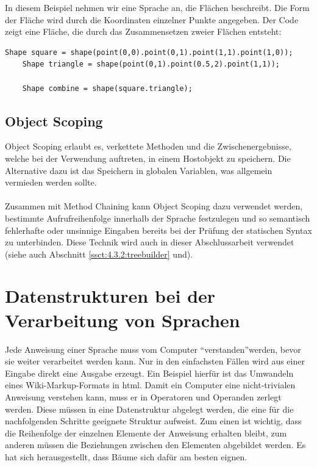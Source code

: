 In diesem Beispiel nehmen wir eine Sprache an, die Flächen beschreibt. Die Form der Fläche wird durch die Koordinaten einzelner Punkte angegeben. Der Code zeigt eine Fläche, die durch das Zusammensetzen zweier Flächen entsteht:

\begin{lstlisting}[caption=beispielhafte Verwendung von Method Nesting]
	Shape square = shape(point(0,0).point(0,1).point(1,1).point(1,0));
	Shape triangle = shape(point(0,1).point(0.5,2).point(1,1));
	
	Shape combine = shape(square.triangle);
\end{lstlisting}

\subsection{Object Scoping}\label{ssct:4.1.3:scoping}
Object Scoping erlaubt es, verkettete Methoden und die Zwischenergebnisse, welche bei der Verwendung auftreten, in einem Hostobjekt zu speichern. Die Alternative dazu ist das Speichern in globalen Variablen, was allgemein vermieden werden sollte\cite{book:fowlerDSL}.
\\ \\
Zusammen mit Method Chaining kann Object Scoping dazu verwendet werden, bestimmte Aufrufreihenfolge innerhalb der Sprache festzulegen und so semantisch fehlerhafte oder unsinnige Eingaben bereits bei der Prüfung der statischen Syntax zu unterbinden. Diese Technik wird auch in dieser Abschlussarbeit verwendet (siehe auch Abschnitt \ref{ssct:4.3.2:treebuilder} und).

\section{Datenstrukturen bei der Verarbeitung von Sprachen}\label{sct:4.2:datenstrukturen}
Jede Anweisung einer Sprache muss vom Computer \textquotedblleft verstanden\textquotedblright werden, bevor sie weiter verarbeitet werden kann. Nur in den einfachsten Fällen wird aus einer Eingabe direkt eine Ausgabe erzeugt. Ein Beispiel hierfür ist das Umwandeln eines Wiki-Markup-Formats in html\cite{book:parrLang}.
Damit ein Computer eine nicht-trivialen Anweisung verstehen kann, muss er in Operatoren und Operanden zerlegt werden. Diese müssen in eine Datenstruktur abgelegt werden, die eine für die nachfolgenden Schritte geeignete Struktur aufweist. Zum einen ist wichtig, dass die Reihenfolge der einzelnen Elemente der Anweisung erhalten bleibt, zum anderen müssen die Beziehungen zwischen den Elementen abgebildet werden. Es hat sich herausgestellt, dass Bäume sich dafür am besten eignen\cite{book:parrLang}.

